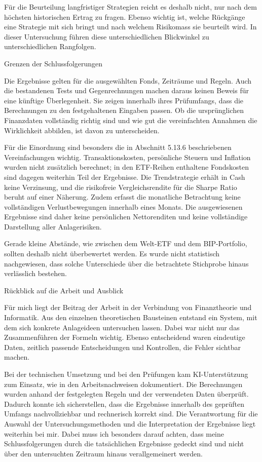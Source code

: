 \documentclass[
  ngerman,
  a4paper,
  DIV=11,
  oneside]{scrreprt}
\begin{document}
Für die Beurteilung langfristiger Strategien reicht es deshalb nicht,
nur nach dem höchsten historischen Ertrag zu fragen. Ebenso wichtig ist,
welche Rückgänge eine Strategie mit sich bringt und nach welchem
Risikomass sie beurteilt wird. In dieser Untersuchung führen diese
unterschiedlichen Blickwinkel zu unterschiedlichen Rangfolgen.

Grenzen der Schlussfolgerungen

Die Ergebnisse gelten für die ausgewählten Fonds, Zeiträume und Regeln.
Auch die bestandenen Tests und Gegenrechnungen machen daraus keinen
Beweis für eine künftige Überlegenheit. Sie zeigen innerhalb ihres
Prüfumfangs, dass die Berechnungen zu den festgehaltenen Eingaben
passen. Ob die ursprünglichen Finanzdaten vollständig richtig sind und
wie gut die vereinfachten Annahmen die Wirklichkeit abbilden, ist davon
zu unterscheiden.

Für die Einordnung sind besonders die in Abschnitt 5.13.6 beschriebenen
Vereinfachungen wichtig. Transaktionskosten, persönliche Steuern und
Inflation wurden nicht zusätzlich berechnet; in den ETF-Reihen
enthaltene Fondskosten sind dagegen weiterhin Teil der Ergebnisse. Die
Trendstrategie erhält in Cash keine Verzinsung, und die risikofreie
Vergleichsrendite für die Sharpe Ratio beruht auf einer Näherung. Zudem
erfasst die monatliche Betrachtung keine vollständigen Verlustbewegungen
innerhalb eines Monats. Die ausgewiesenen Ergebnisse sind daher keine
persönlichen Nettorenditen und keine vollständige Darstellung aller
Anlagerisiken.

Gerade kleine Abstände, wie zwischen dem Welt-ETF und dem BIP-Portfolio,
sollten deshalb nicht überbewertet werden. Es wurde nicht statistisch
nachgewiesen, dass solche Unterschiede über die betrachtete Stichprobe
hinaus verlässlich bestehen.

Rückblick auf die Arbeit und Ausblick

Für mich liegt der Beitrag der Arbeit in der Verbindung von
Finanztheorie und Informatik. Aus den einzelnen theoretischen Bausteinen
entstand ein System, mit dem sich konkrete Anlageideen untersuchen
lassen. Dabei war nicht nur das Zusammenführen der Formeln wichtig.
Ebenso entscheidend waren eindeutige Daten, zeitlich passende
Entscheidungen und Kontrollen, die Fehler sichtbar machen.

Bei der technischen Umsetzung und bei den Prüfungen kam KI-Unterstützung
zum Einsatz, wie in den Arbeitsnachweisen dokumentiert. Die Berechnungen
wurden anhand der festgelegten Regeln und der verwendeten Daten
überprüft. Dadurch konnte ich sicherstellen, dass die Ergebnisse
innerhalb des geprüften Umfangs nachvollziehbar und rechnerisch korrekt
sind. Die Verantwortung für die Auswahl der Untersuchungsmethoden und
die Interpretation der Ergebnisse liegt weiterhin bei mir. Dabei muss
ich besonders darauf achten, dass meine Schlussfolgerungen durch die
tatsächlichen Ergebnisse gedeckt sind und nicht über den untersuchten
Zeitraum hinaus verallgemeinert werden.
\end{document}
